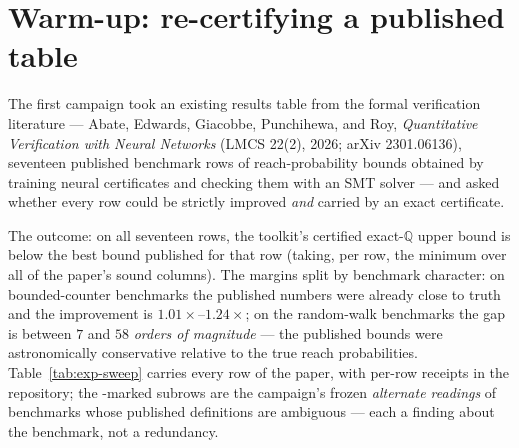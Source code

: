\section{Warm-up: re-certifying a published table}
\label{sec:exp-sweep}

The first campaign took an existing results table from the formal
verification literature --- Abate, Edwards, Giacobbe, Punchihewa, and
Roy, \emph{Quantitative Verification with Neural Networks} (LMCS 22(2),
2026; arXiv 2301.06136), seventeen published benchmark rows of
reach-probability bounds obtained by training neural certificates and
checking them with an SMT solver --- and asked whether every row could
be strictly improved \emph{and} carried by an exact certificate.

The outcome: on all seventeen rows, the toolkit's certified
exact-$\mathbb{Q}$ upper bound is below the best bound published for
that row (taking, per row, the minimum over all of the paper's sound
columns). The margins split by benchmark character: on bounded-counter
benchmarks the published numbers were already close to truth and the
improvement is $1.01\times$--$1.24\times$; on the random-walk
benchmarks the gap is between $7$ and $58$ \emph{orders of magnitude}
--- the published bounds were astronomically conservative relative to
the true reach probabilities. Table~\ref{tab:exp-sweep} carries every
row of the paper, with per-row receipts in the repository; the
\altrow-marked subrows are the campaign's frozen \emph{alternate
readings} of benchmarks whose published definitions are ambiguous ---
each a finding about the benchmark, not a redundancy.

